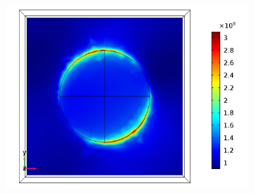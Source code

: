 \begin{figure}[htb!]
\begin{subfigure}{0.32\textwidth}
        \centering
        \includegraphics[width=\linewidth]{figures/ch4/S5A/FieldDistribution/phi25/Sample5A_TE_Slice@z=0_wl=500_phi=25.png}
   \end{subfigure}
   \vspace{0.7cm}
   

\end{figure}
